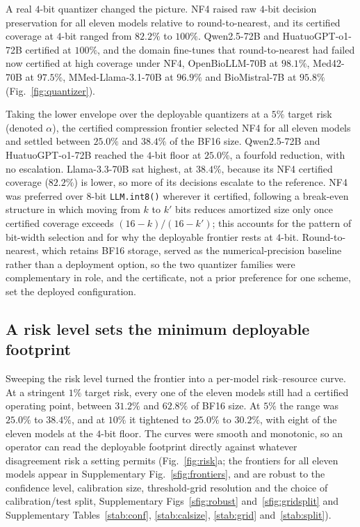 \documentclass[pdflatex,sn-mathphys-num]{sn-jnl}%
\theoremstyle{thmstyleone}%
\theoremstyle{thmstyletwo}%
\theoremstyle{thmstylethree}%
\begin{document}
A real $4$-bit quantizer changed the picture. NF4 raised raw $4$-bit decision preservation for all
eleven models relative to round-to-nearest, and its certified coverage at $4$-bit ranged from
$82.2\%$ to $100\%$. Qwen2.5-72B and HuatuoGPT-o1-72B certified at $100\%$, and the domain
fine-tunes that round-to-nearest had failed now certified at high coverage under NF4, OpenBioLLM-70B
at $98.1\%$, Med42-70B at $97.5\%$, MMed-Llama-3.1-70B at $96.9\%$ and BioMistral-7B at $95.8\%$ (Fig.~\ref{fig:quantizer}).

Taking the lower envelope over the deployable quantizers at a $5\%$ target risk (denoted $\alpha$), the certified compression
frontier selected NF4 for all eleven models and settled between $25.0\%$ and $38.4\%$ of the
BF16 size. Qwen2.5-72B and HuatuoGPT-o1-72B reached the $4$-bit floor at $25.0\%$, a fourfold
reduction, with no escalation. Llama-3.3-70B sat highest, at $38.4\%$, because its NF4 certified coverage
($82.2\%$) is lower, so more of its decisions escalate to the reference. NF4 was preferred over $8$-bit
\texttt{LLM.int8()} wherever it certified, following a break-even structure in which moving
from $k$ to $k'$ bits reduces amortized size only once certified coverage exceeds
$(16-k)/(16-k')$; this accounts for the pattern of bit-width selection and for why the deployable frontier
rests at $4$-bit. Round-to-nearest, which retains BF16 storage, served as the numerical-precision
baseline rather than a deployment option, so the two quantizer families were complementary in role, and
the certificate, not a prior preference for one scheme, set the deployed configuration.
 
\subsection*{A risk level sets the minimum deployable footprint}
 
Sweeping the risk level turned the frontier into a per-model risk--resource curve. At a stringent
$1\%$ target risk, every one of the eleven models still had a certified operating point,
between $31.2\%$ and $62.8\%$ of BF16 size. At $5\%$ the range was $25.0\%$ to $38.4\%$, and at
$10\%$ it tightened to $25.0\%$ to $30.2\%$, with eight of the eleven models at the $4$-bit floor. The
curves were smooth and monotonic, so an operator can read the deployable footprint directly against
whatever disagreement risk a setting permits (Fig.~\ref{fig:risk}a; the frontiers for all eleven
models appear in Supplementary Fig.~\ref{sfig:frontiers}, and are robust to the confidence level,
calibration size, threshold-grid resolution and the choice of calibration/test split, Supplementary
Figs~\ref{sfig:robust} and~\ref{sfig:gridsplit} and Supplementary Tables~\ref{stab:conf},
\ref{stab:calsize}, \ref{stab:grid} and~\ref{stab:split}).
 
\end{document}
